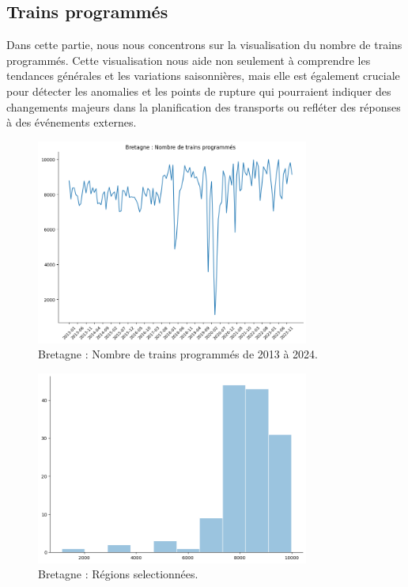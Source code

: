 {\subsection{Trains programmés}

Dans cette partie, nous nous concentrons sur la visualisation du nombre de trains programmés. Cette visualisation nous aide non seulement à comprendre les tendances générales et les variations saisonnières, mais elle est également cruciale pour détecter les anomalies et les points de rupture qui pourraient indiquer des changements majeurs dans la planification des transports ou refléter des réponses à des événements externes.

\begin{figure}[H]
\centering
\includegraphics[width=0.8\textwidth]{image/BR-FIG1.png} 
\caption{Bretagne : Nombre de trains programmés de 2013 à 2024.}
\label{fig:trains_programmes}
\end{figure}

\begin{figure}[H]
\centering
\includegraphics[width=0.8\textwidth]{image/BR-FIG2.png} 
\caption{Bretagne : Régions selectionnées.}
\label{fig:trains_programmes_2}
\end{figure}


}
